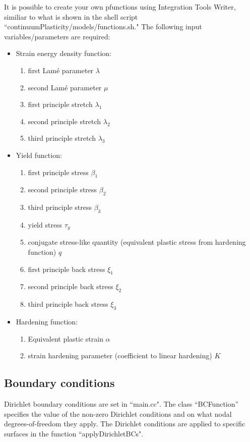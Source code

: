 \documentclass[10pt]{article}
\begin{document}
It is possible to create your own pfunctions using Integration Tools Writer, similiar to what is shown in the shell script ``continuumPlasticity/models/functions.sh." The following input variables/parameters are required:
\begin{itemize}
\itemsep-0.5em
\item Strain energy density function:
\vspace{-3mm}
\begin{enumerate}
\itemsep-0.5em
\item first Lam\'e parameter $\lambda$
\item second Lam\'e parameter $\mu$
\item first principle stretch $\lambda_1$
\item second principle stretch $\lambda_2$
\item third principle stretch $\lambda_3$
\end{enumerate}
%
\item Yield function:
\begin{enumerate}
\vspace{-3mm}
\itemsep-0.5em
\item first principle stress $\beta_1$
\item second principle stress $\beta_2$
\item third principle stress $\beta_3$
\item yield stress $\tau_y$
\item conjugate stress-like quantity (equivalent plastic stress from hardening function) $q$
\item first principle back stress $\xi_1$
\item second principle back stress $\xi_2$
\item third principle back stress $\xi_3$
\end{enumerate}
%
\item Hardening function:
\begin{enumerate}
\vspace{-3mm}
\itemsep-0.5em
\item Equivalent plastic strain $\alpha$
\item strain hardening parameter (coefficient to linear hardening) $K$
\end{enumerate}
\end{itemize}

\subsection{Boundary conditions}
Dirichlet boundary conditions are set in ``main.cc". The class ``BCFunction'' specifies the value of the non-zero Dirichlet conditions and on what nodal degrees-of-freedom they apply. The Dirichlet conditions are applied to specific surfaces in the function ``applyDirichletBCs".
\end{document}
